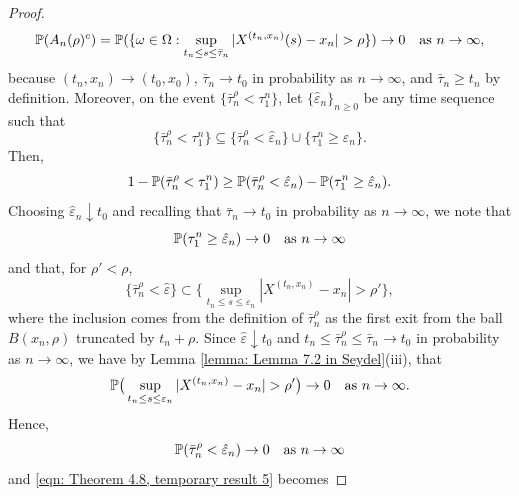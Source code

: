 \begin{proof}
\begin{equation*}
        \mathbb{P} (A_n(\rho)^c) = \mathbb{P}(\{ \omega \in \Omega: \sup_{t_n \leq s \leq \bar \tau_n} |X^{(t_n,x_n)}(s) - x_n| > \rho\}) \rightarrow 0 \quad \text{as } n \rightarrow \infty,
    \end{equation*}
    because $(t_n,x_n) \rightarrow (t_0,x_0)$, $\bar \tau_n \rightarrow t_0$ in probability as $n \rightarrow \infty$, and $\bar \tau_n \geq t_n$ by definition. Moreover, on the event $\{\bar \tau_n^\rho < \tau_1^n\}$, let $\{\hat \varepsilon_n\}_{n \geq 0}$ be any time sequence such that 
    \begin{equation*}
        \{ \bar \tau_n^\rho < \tau_1^n\} \subseteq \{\bar \tau_n^\rho < \hat \varepsilon_n \} \cup \{\tau_1^n \geq \hat \varepsilon_n\}. 
    \end{equation*}
    Then, 
    \begin{equation*}
        1-\mathbb{P}(\bar \tau_n^\rho < \tau_1^n) \geq \mathbb{P}(\bar \tau_n^\rho < \hat \varepsilon_n) - \mathbb{P}(\tau_1^n \geq \hat \varepsilon_n). 
    \end{equation*}
    Choosing $\hat \varepsilon_n \downarrow t_0$ and recalling that $\bar \tau_n \rightarrow t_0$ in probability as $n \rightarrow \infty$, we note that 
    \begin{equation*}
        \mathbb{P} (\tau_1^n \geq \hat \varepsilon_n) \rightarrow 0 \quad \text{as }  n \rightarrow \infty
    \end{equation*}
    and that, for $\rho' < \rho$, 
    \begin{equation*}
        \{\bar \tau_n^\rho < \hat \varepsilon\} \subset \big\{ \sup_{t_n \leq s \leq \varepsilon_n} |X^{(t_n,x_n)} - x_n| > \rho' \big\},
    \end{equation*}
    where the inclusion comes from the definition of $\bar \tau_n^\rho$ as the first exit from the ball $B(x_n,\rho)$ truncated by $t_n + \rho$. Since $\hat \varepsilon \downarrow t_0$ and $t_n \leq \bar \tau_n^\rho \leq \bar \tau_n \rightarrow t_0$ in probability as $n \rightarrow \infty$, we have by Lemma \ref{lemma: Lemma 7.2 in Seydel}(iii), that 
    \begin{equation*}
        \mathbb{P} \big( \sup_{t_n \leq s \leq \varepsilon_n} |X^{(t_n,x_n)} - x_n| > \rho' \big) \rightarrow 0 \quad \text{as } n \rightarrow \infty.
    \end{equation*}
    Hence, 
    \begin{equation*}
        \mathbb{P}(\bar \tau_n^\rho < \hat \varepsilon_n) \rightarrow 0 \quad \text{as } n \rightarrow \infty
    \end{equation*}
    and \eqref{eqn: Theorem 4.8, temporary result 5} becomes

\end{proof}

